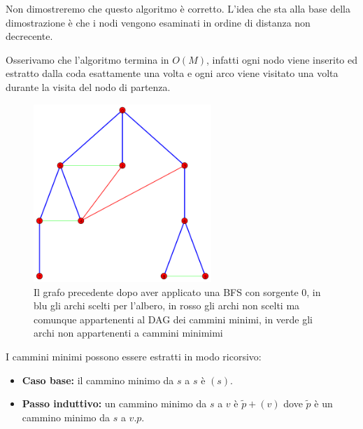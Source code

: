 \documentclass[a4paper,10pt]{amsbook}
\theoremstyle{plain}
\theoremstyle{definition}
\theoremstyle{remark}
\newcommand{\pa}[1]{\left(#1\right)}
\begin{document}
\begin{figure}[H]
  \begin{algorithmic}
      
    \EndFor
            
      
    \EndIf
    \EndFor
    \EndWhile
  \end{algorithmic}
\label{fig:BFScode}
\end{figure}
Non dimostreremo che questo algoritmo \`e corretto. L'idea che sta
alla base della dimostrazione \`e che i nodi vengono esaminati in
ordine di distanza non decrecente.

Osserivamo che l'algoritmo termina in $O\pa{M}$, infatti ogni nodo
viene inserito ed estratto dalla coda esattamente una volta e ogni
arco viene visitato una volta durante la visita del nodo di partenza.

\begin{figure}[h]
  \centering
  \includegraphics[width=0.6\textwidth]{BFS}
  \caption{Il grafo precedente dopo aver applicato una BFS con
    sorgente $0$, in blu gli archi scelti per l'albero, in rosso gli
    archi non scelti ma comunque appartenenti al DAG dei cammini
    minimi, in verde gli archi non appartenenti a cammini minimimi}
  \label{fig:BFS}
\end{figure}

I cammini minimi possono essere estratti in modo ricorsivo:
\begin{itemize}
\item \textbf{Caso base:} il cammino minimo da $s$ a $s$ \`e $(s)$.
\item \textbf{Passo induttivo:} un cammino minimo da $s$ a $v$ \`e
  $\tilde p + (v)$ dove $\tilde p$ \`e un cammino minimo da $s$ a $v.p$.
\end{itemize}
\end{document}
